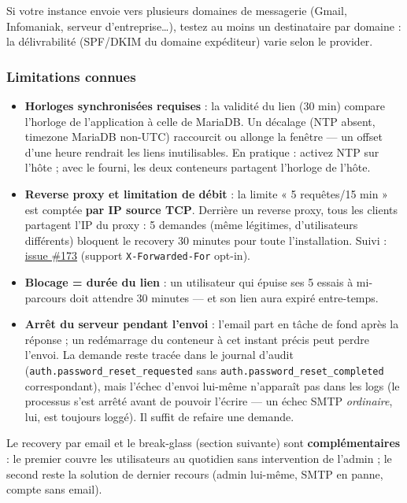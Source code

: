 \documentclass[a4paper,11pt,oneside]{article}
\begin{document}
Si votre instance envoie vers plusieurs domaines de messagerie (Gmail, Infomaniak, serveur d'entreprise\ldots), testez au moins un destinataire par domaine : la délivrabilité (SPF/DKIM du domaine expéditeur) varie selon le provider.

\subsubsection{Limitations connues}

\begin{itemize}
    \item \textbf{Horloges synchronisées requises} : la validité du lien (30 min) compare l'horloge de l'application à celle de MariaDB. Un décalage (NTP absent, timezone MariaDB non-UTC) raccourcit ou allonge la fenêtre — un offset d'une heure rendrait les liens inutilisables. En pratique : activez NTP sur l'hôte ; avec le  fourni, les deux conteneurs partagent l'horloge de l'hôte.
    \item \textbf{Reverse proxy et limitation de débit} : la limite « 5 requêtes/15 min » est comptée \textbf{par IP source TCP}. Derrière un reverse proxy, tous les clients partagent l'IP du proxy : 5 demandes (même légitimes, d'utilisateurs différents) bloquent le recovery 30 minutes pour toute l'installation. Suivi : \href{https://github.com/guycorbaz/kesh/issues/173}{issue \#173} (support \texttt{X-Forwarded-For} opt-in).
    \item \textbf{Blocage = durée du lien} : un utilisateur qui épuise ses 5 essais à mi-parcours doit attendre 30 minutes — et son lien aura expiré entre-temps.
    \item \textbf{Arrêt du serveur pendant l'envoi} : l'email part en tâche de fond après la réponse ; un redémarrage du conteneur à cet instant précis peut perdre l'envoi. La demande reste tracée dans le journal d'audit (\texttt{auth.password\_reset\_requested} sans \texttt{auth.password\_reset\_completed} correspondant), mais l'échec d'envoi lui-même n'apparaît pas dans les logs (le processus s'est arrêté avant de pouvoir l'écrire — un échec SMTP \emph{ordinaire}, lui, est toujours loggé). Il suffit de refaire une demande.
\end{itemize}

\begin{keshtip}
Le recovery par email et le break-glass (section suivante) sont \textbf{complémentaires} : le premier couvre les utilisateurs au quotidien sans intervention de l'admin ; le second reste la solution de dernier recours (admin lui-même, SMTP en panne, compte sans email).
\end{keshtip}
\end{document}
